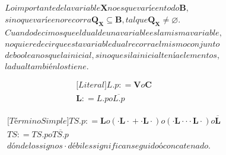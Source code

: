 \begin{enumerate}
\begin{enumerate}
\begin{enumerate}
\begin{enumerate}
        \[\begin{matrix}
        {\mathit{Lo}\mathit{importante}\mathit{de}\mathit{la}\mathit{variable}\mathbf{X}\mathit{no}\mathit{es}\mathit{que}\mathit{varíe}\mathit{en}\mathit{todo}\mathbf{B},} \\
        {\mathit{sino}\mathit{que}\mathit{varíe}\mathit{en}o\mathit{recorra}{\mathbf{Q_{X}} \subseteq \mathbf{B}},\mathit{tal}\mathit{que}{\mathbf{Q_{X}} \neq \varnothing}.} \\
        {\mathit{Cuando}\mathit{decimos}\mathit{que}\mathit{el}\mathit{dual}\mathit{de}\mathit{una}\mathit{variable}\mathit{es}\mathit{la}\mathit{misma}\mathit{variable},} \\
        {\mathit{no}\mathit{quiere}\mathit{decir}\mathit{que}\mathit{esta}\mathit{variable}\mathit{dual}\mathit{recorra}\mathit{el}\mathit{mismo}\mathit{conjunto}} \\
        {\mathit{de}\mathit{booleanos}\mathit{que}\mathit{la}\mathit{inicial},\mathit{sino}\mathit{que}\mathit{si}\mathit{la}\mathit{inicial}\mathit{tenía}\mathit{elementos},} \\
        {\mathit{la}\mathit{dual}\mathit{también}\mathit{los}\mathit{tiene.}}
        \end{matrix}\]

        \[\begin{matrix}
        {{\lbrack\mathbf{\mathit{Literal}}\rbrack}\mathbf{\mathit{L.p}}{: =}\mathbf{V}o\mathbf{C}} \\
        {\mathbf{L}{: =}\mathbf{\mathit{L.p}}o\overline{\mathbf{\mathit{L.p}}}}
        \end{matrix}\]

        \[\begin{matrix}
        {{\lbrack\mathbf{\mathit{Término}\mathit{Simple}}\rbrack}\mathbf{\mathit{TS.p}}{: =}\mathbf{L}o\left( {{{\cdot \mathbf{L}} \cdot} + {{\cdot \mathbf{L}} \cdot}} \right)o\left( {{{{\cdot \mathbf{L}} \cdot \mathbf{\mathrm{\cdot}}} \cdot \mathbf{L}} \cdot} \right)o\overline{\mathbf{L}}} \\
        {\mathbf{\mathit{TS}}{: =}\mathbf{\mathit{TS.p}}o\mathbf{\overline{\mathit{TS.p}}}} \\
        {\mathit{dónde}\mathit{los}\mathit{signos} \cdot \mathit{débiles}\mathit{significan}\mathit{seguido}ó\mathit{concatenado.}}
        \end{matrix}\]


\end{enumerate}
\end{enumerate}
\end{enumerate}
\end{enumerate}
